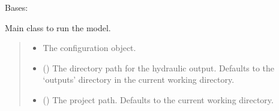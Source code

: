 \documentclass[a4paper,11pt,english,openany]{sphinxmanual}
\begin{document}
\begin{fulllineitems}
\label{\detokenize{api/spyice.main_process:spyice.main_process.MainProcess}}
\pysigstartsignatures
{}
\pysigstopsignatures
\sphinxAtStartPar
Bases: 

\sphinxAtStartPar
Main class to run the model.
\begin{quote}\begin{description}
\begin{itemize}
\item {} 
\sphinxAtStartPar
{} \textendash{} The configuration object.

\item {} 
\sphinxAtStartPar
{} (\sphinxstyleliteralemphasis{\sphinxupquote{ | }}) \textendash{} The directory path for the hydraulic output. Defaults to the ‘outputs’ directory in the current working directory.

\item {} 
\sphinxAtStartPar
{} (\sphinxstyleliteralemphasis{\sphinxupquote{ | }}) \textendash{} The project path. Defaults to the current working directory.

\end{itemize}

\end{description}\end{quote}


\end{fulllineitems}
\end{document}
